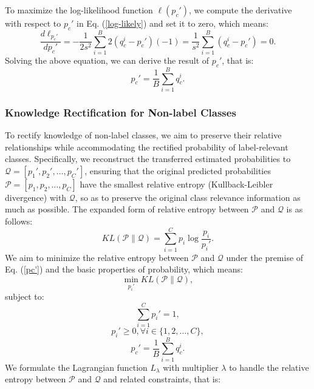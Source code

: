 \documentclass[10pt,journal]{IEEEtran}
\let\oldsum\sum
\renewcommand{\sum}{\displaystyle\oldsum}
\begin{document}
To maximize the log-likelihood function $\ell(p_c')$, we compute the derivative with respect to $p_c'$ in Eq. (\ref{log-likely}) and set it to zero, which means:
\begin{equation}
    \frac{d\ell_{p_c'}}{dp_c'} = - \frac{1}{2 s^2} \sum_{i=1}^B 2 (q_c^i - p_c') (-1) = \frac{1}{s^2} \sum_{i=1}^B (q_c^i - p_c') = 0.
\end{equation}
Solving the above equation, we can derive the result of $p_c'$, that is:
\begin{equation}
    p_c' = \frac{1}{B} \sum_{i=1}^B q_c^i.
    \label{pc'}
\end{equation}


\subsubsection{Knowledge Rectification for Non-label Classes}
To rectify knowledge of non-label classes, we aim to preserve their relative relationships while accommodating the rectified probability of label-relevant classes. Specifically, we reconstruct the transferred estimated probabilities to $\mathcal{Q}={[p_1',p_2',…,p_C']}$, ensuring that the original predicted probabilities $\mathcal{P}={[p_1,p_2,…,p_C]}$ have the smallest relative entropy (Kullback-Leibler divergence) with $\mathcal{Q}$, so as to preserve the original class relevance information as much as possible. The expanded form of relative entropy between $\mathcal{P}$ and $\mathcal{Q}$ is as follows:
\begin{equation}
    {KL}(\mathcal{P} \parallel \mathcal{Q}) = \sum_{i=1}^C p_i \log \frac{p_i}{p_i'}.
\end{equation}
We aim to minimize the relative entropy between $\mathcal{P}$ and $\mathcal{Q}$ under the premise of Eq. (\ref{pc'}) and the basic properties of probability, which means:
\begin{equation}
    \mathop {\min }\limits_{{p_i'}} KL(\mathcal{P} \parallel \mathcal{Q}),
\end{equation}
subject to:
\begin{equation}
    \sum_{i=1}^C p_i' =1,
    \label{prob-constrain}
\end{equation}
\begin{equation}
    p_i' \geq 0 ,\forall i \in \{1,2,...,C\},
    \label{non-neg}
\end{equation}
\begin{equation}
    p_c' = \frac{1}{B} \sum_{i=1}^B q_c^i.
\end{equation}
We formulate the Lagrangian function $L_\lambda$ with multiplier $\lambda$ to handle the relative entropy between $\mathcal{P}$ and $\mathcal{Q}$ and related constraints, that is:
\end{document}
